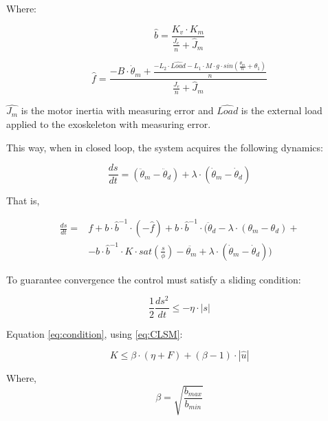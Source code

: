 Where:

\begin{equation}
\label{eq:bSM}
\hat{b} = \frac{K_v \cdot K_m}{\frac{J_e}{n}+\hat{J}_m}
\end{equation}

\begin{equation}
\label{eq:fSM}
\hat{f} = \frac{-B \cdot \dot{\theta}_m + \frac{-L_2 \cdot \hat{Load} - L_1 \cdot M \cdot g \cdot sin(\frac{\theta_m}{n}+\theta_1)}{n}}{\frac{J_e}{n}+\hat{J}_m}
\end{equation}

\(\hat{J_m}\) is the motor inertia with measuring error and \(\hat{Load}\) is the external load applied to the exoskeleton with measuring error.

This way, when in closed loop, the system acquires the following dynamics:

\begin{equation}
\label{eq:CLSM}
\frac{ds}{dt} = (\ddot{\theta}_m-\ddot{\theta}_{d})+\lambda \cdot (\dot{\theta}_m-\dot{\theta}_{d})
\end{equation}

That is,

\begin{equation}
\begin{split}
\label{eq:CLSM}
\frac{ds}{dt} = {} & f + b \cdot \hat{b}^{-1} \cdot (-\hat{f}) + b \cdot \hat{b}^{-1} \cdot (\ddot{\theta}_{d} - \lambda \cdot (\theta_m - \theta_{d}) +  \\
& - b \cdot \hat{b}^{-1} \cdot K \cdot sat(\frac{s}{\phi})-\ddot{\theta_m} + \lambda \cdot (\dot{\theta}_m-\dot{\theta}_{d}))
\end{split}
\end{equation}

To guarantee convergence the control must satisfy a sliding condition:

\begin{equation}
\label{eq:condition}
\frac{1}{2}\frac{ds^2}{dt} \leq -\eta \cdot |s|
\end{equation}

Equation \ref{eq:condition}, using \ref{eq:CLSM}:

\begin{equation}
\label{eq:K}
K \leq \beta \cdot (\eta + F) + (\beta -1) \cdot |\hat{u}|
\end{equation}

Where,
\begin{equation}
\label{eq:beta}
\beta = \sqrt{\frac{b_{max}}{b_{min}}}
\end{equation}

